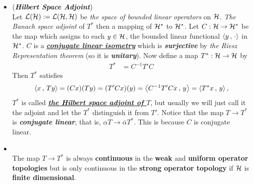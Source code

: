 \documentclass[11pt]{article}
\begin{document}
\begin{itemize}
\item \begin{remark} (\emph{\textbf{Hilbert Space Adjoint}})\\
Let ${\mathcal L}({\mathcal H}):= {\mathcal L}({\mathcal H}, {\mathcal H})$ be \emph{the space of bounded linear operators} on ${\mathcal H}$. \emph{The Banach space adjoint} of $T^{*}$  then a mapping of  ${\mathcal H}^{*}$ to ${\mathcal H}^{*}$. Let $C:  {\mathcal H} \rightarrow  {\mathcal H}^{*}$ be the map which assigns to each $y \in {\mathcal H}$, the bounded linear functional $\left\langle y\,,\, \cdot \right\rangle$ in ${\mathcal H}^{*}$.  $C$ is a \underline{\emph{\textbf{conjugate linear isometry}}} which is \emph{\textbf{surjective}} by \emph{the Riesz Representation theorem} (so it is \emph{\textbf{unitary}}). Now define a map $T^{*}: {\mathcal H} \rightarrow {\mathcal H}$ by 
\begin{align*}
T^{*} &= C^{-1}T' C
\end{align*}
Then $T^{*}$ satisfies 
\begin{align*}
\left\langle x\,,\, Ty \right\rangle = (Cx)(Ty) = (T'Cx)(y) = \left\langle C^{-1}T'Cx\,,\, y \right\rangle = \left\langle T^{*}x\,,\, y \right\rangle,
\end{align*}
$T^*$ is called  \underline{\emph{\textbf{the Hilbert space adjoint of $T$}}}, but usually we will just call it the  adjoint and let the $T^*$ distinguish it from $T'$. Notice that the map $T \rightarrow T^*$ is \emph{\textbf{conjugate linear}}, that is, $\alpha T  \rightarrow \bar{\alpha} T^*$. This is because $C$ is conjugate linear. 
\end{remark}

\item \begin{proposition} \citep{reed1980methods}\\
The map $T \rightarrow T^*$ is always \textbf{continuous} in the \textbf{weak} and \textbf{uniform operator topologies} but is only continuous in the \textbf{strong operator topology} if ${\mathcal H}$ is \textbf{finite dimensional}. 
\end{proposition}
\end{itemize}
\end{document}
